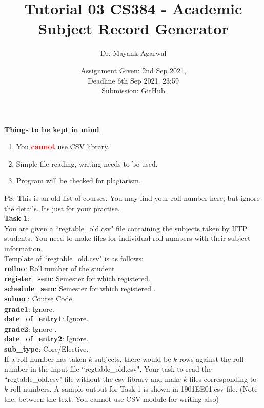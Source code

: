 \documentclass[12pt,  letterpaper,  twoside]{article}
\title{Tutorial 03 CS384 -  Academic Subject Record Generator}
\author{Dr. Mayank Agarwal}
\date{Assignment Given: 2nd Sep 2021,\\ Deadline 6th Sep 2021,  
23:59\\Submission: GitHub }
\begin{document}
	\maketitle  
	\textbf{Things to be kept in mind}\\
	\begin{enumerate}
		\item You \textcolor{red}{\textbf{cannot}} use CSV library.  
		\item  Simple file reading, writing needs to be used.
		\item Program will be checked for plagiarism.  
	\end{enumerate}
	
PS: This is an old list of courses. You may find your roll number here, but 
ignore the details. Its  just for your practise. \\

\textbf{Task 1}:\\ You are given a ``regtable\_old.csv" file containing the 
subjects taken by IITP students. You need to make files for individual roll 
numbers with their subject information.\\

\noindent Template of ``regtable\_old.csv" is as follows:\\
\noindent \textbf{rollno}: Roll number of the student \\
	\textbf{register\_sem}: Semester for which registered. \\	
		\textbf{schedule\_sem}: Semester for which registered	. \\
		\textbf{subno}	: Course Code. \\
		\textbf{grade1}: Ignore. \\
			\textbf{date\_of\_entry1}: Ignore. \\
				\textbf{grade2}: Ignore	. \\
	\textbf{date\_of\_entry2}: Ignore. \\
		\textbf{sub\_type}: Core/Elective. \\


If a roll number has taken $ k $ subjects, there would be $ k $ rows against 
the roll number in the input file   ``regtable\_old.csv". Your task to read 
the  
``regtable\_old.csv" file without the csv library and make $ k $ files 
corresponding to $ k $ roll numbers. A sample output for Task 1 is shown in 
1901EE01.csv  file. (Note the, between the text. You cannot use CSV 
module for writing also)\\
\end{document}
